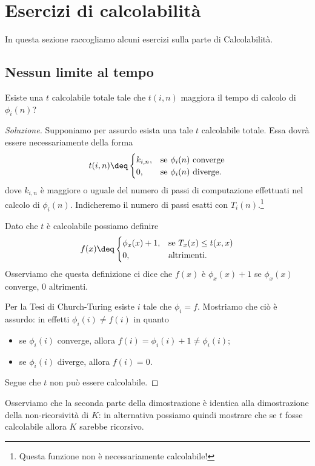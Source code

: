 \section{Esercizi di calcolabilità}

In questa sezione raccogliamo alcuni esercizi sulla parte di Calcolabilità.

\subsection*{Nessun limite al tempo}

Esiste una $t$ calcolabile totale tale che $t(i, n)$ maggiora il tempo di calcolo di $\phi_i(n)$?

\begin{proof}[Soluzione]
    Supponiamo per assurdo esista una tale $t$ calcolabile totale. Essa dovrà essere necessariamente della forma \[
        t(i, n) \deq \begin{cases}
            k_{i, n}, &\text{se } \phi_i(n) \text{ converge}\\
            0, &\text{se } \phi_i(n) \text{ diverge.} 
        \end{cases}
    \] dove $k_{i, n}$ è maggiore o uguale del numero di passi di computazione effettuati nel calcolo di $\phi_i(n)$. Indicheremo il numero di passi esatti con $T_i(n)$.\footnote{Questa funzione non è necessariamente calcolabile!}
    
    Dato che $t$ è calcolabile possiamo definire \[
        f(x) \deq \begin{cases}
            \phi_x(x) + 1, &\text{se } T_x(x) \leq t(x, x)\\
            0, &\text{altrimenti}.
        \end{cases}
    \] Osserviamo che questa definizione ci dice che $f(x)$ è $\phi_x(x) + 1$ se $\phi_x(x)$ converge, $0$ altrimenti.
    
    Per la Tesi di Church-Turing esiste $i$ tale che $\phi_i = f$. Mostriamo che ciò è assurdo: in effetti $\phi_i(i) \neq f(i)$ in quanto \begin{itemize}
        \item se $\phi_i(i)$ converge, allora $f(i) = \phi_i(i) + 1 \neq \phi_i(i)$;
        \item se $\phi_i(i)$ diverge, allora $f(i) = 0$.    
    \end{itemize}
    Segue che $t$ non può essere calcolabile.  
\end{proof}

Osserviamo che la seconda parte della dimostrazione è identica alla dimostrazione della non-ricorsività di $K$: in alternativa possiamo quindi mostrare che se $t$ fosse calcolabile allora $K$ sarebbe ricorsivo.

